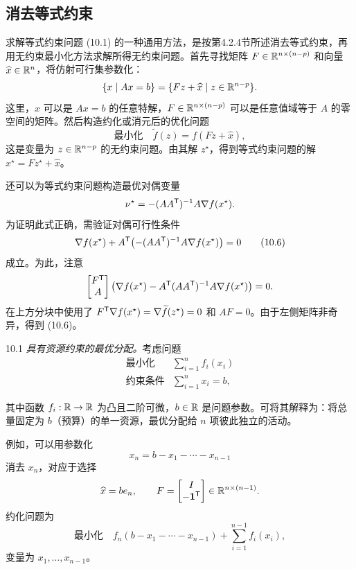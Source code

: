 \subsection{消去等式约束}
求解等式约束问题 (10.1) 的一种通用方法，是按第4.2.4节所述消去等式约束，再用无约束最小化方法求解所得无约束问题。首先寻找矩阵 $F\in\mathbb R^{n\times(n-p)}$ 和向量 $\widehat x\in\mathbb R^n$，将仿射可行集参数化：
\[\{x\mid Ax=b\}=\{Fz+\widehat x\mid z\in\mathbb R^{n-p}\}.\]
这里，$\widehat x$ 可以是 $Ax=b$ 的任意特解，$F\in\mathbb R^{n\times(n-p)}$ 可以是任意值域等于 $A$ 的零空间的矩阵。然后构造约化或消元后的优化问题
\begin{equation}\text{最小化}\quad\widetilde f(z)=f(Fz+\widehat x),\tag{10.5}\end{equation}
这是变量为 $z\in\mathbb R^{n-p}$ 的无约束问题。由其解 $z^\star$，得到等式约束问题的解 $x^\star=Fz^\star+\widehat x$。

还可以为等式约束问题构造最优对偶变量
\[\nu^\star=-(AA^\mathsf T)^{-1}A\nabla f(x^\star).\]
为证明此式正确，需验证对偶可行性条件
\begin{equation}\nabla f(x^\star)+A^\mathsf T\bigl(-(AA^\mathsf T)^{-1}A\nabla f(x^\star)\bigr)=0\tag{10.6}\end{equation}
成立。为此，注意
\[\begin{bmatrix}F^\mathsf T\\A\end{bmatrix}\bigl(\nabla f(x^\star)-A^\mathsf T(AA^\mathsf T)^{-1}A\nabla f(x^\star)\bigr)=0.\]
在上方分块中使用了 $F^\mathsf T\nabla f(x^\star)=\nabla\widetilde f(z^\star)=0$ 和 $AF=0$。由于左侧矩阵非奇异，得到 (10.6)。

\begin{origexample}{10.1}
\emph{具有资源约束的最优分配。}考虑问题
\[\begin{array}{ll}\text{最小化}&\displaystyle\sum_{i=1}^n f_i(x_i)\\\text{约束条件}&\displaystyle\sum_{i=1}^n x_i=b,\end{array}\]

其中函数 $f_i:\mathbb R\to\mathbb R$ 为凸且二阶可微，$b\in\mathbb R$ 是问题参数。可将其解释为：将总量固定为 $b$（预算）的单一资源，最优分配给 $n$ 项彼此独立的活动。

例如，可以用参数化
\[x_n=b-x_1-\cdots-x_{n-1}\]
消去 $x_n$，对应于选择
\[\widehat x=be_n,\qquad F=\begin{bmatrix}I\\-\mathbf 1^\mathsf T\end{bmatrix}\in\mathbb R^{n\times(n-1)}.\]
约化问题为
\[\text{最小化}\quad f_n(b-x_1-\cdots-x_{n-1})+\sum_{i=1}^{n-1}f_i(x_i),\]
变量为 $x_1,\ldots,x_{n-1}$。
\end{origexample}

